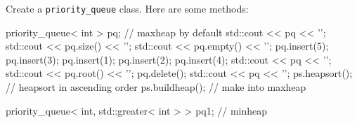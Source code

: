 \begin{ex}
  Create a \verb!priority_queue! class.
  Here are some methods:
  \begin{console}
priority_queue< int > pq; // maxheap by default
std::cout << pq << '\n';
std::cout << pq.size() << '\n';
std::cout << pq.empty() << '\n';
pq.insert(5);
pq.insert(3);
pq.insert(1);
pq.insert(2);
pq.insert(4);
std::cout << pq << '\n';
std::cout << pq.root() << '\n';
pq.delete();
std::cout << pq << '\n';
ps.heapsort();  // heapsort in ascending order
ps.buildheap(); // make into maxheap

priority_queue< int, std::greater< int > > pq1; // minheap
  \end{console}
\end{ex}
